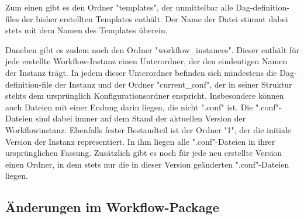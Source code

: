 Zum einen gibt es den Ordner "templates", der unmittelbar alle Dag-definition-files der bisher erstellten Templates enthält. Der Name der Datei stimmt dabei stets mit dem Namen des Templates überein. 

Daneben gibt es zudem noch den Ordner "workflow\_instances". Dieser enthält für jede erstellte Workflow-Instanz einen Unterordner, der den eindeutigen Namen der Instanz trägt. In jedem dieser Unterordner befinden sich mindestens die Dag-definition-file der Instanz und der Ordner "current\_conf", der in seiner Struktur stehts dem ursprünglich Konfigurationsordner enspricht. Insbesondere können auch Dateien mit einer Endung darin liegen, die nicht ".conf" ist. Die ".conf"-Dateien sind dabei immer auf dem Stand der aktuellen Version der Workflowinstanz. Ebenfalls fester Bestandteil ist der Ordner "1", der die initiale Version der Instanz representiert. In ihm liegen alle ".conf"-Dateien in ihrer ursprünglichen Fassung. Zusätzlich gibt es noch für jede neu erstellte Version einen Ordner, in dem stets nur die in dieser Version geänderten ".conf"-Dateien liegen.

\subsection{Änderungen im Workflow-Package}